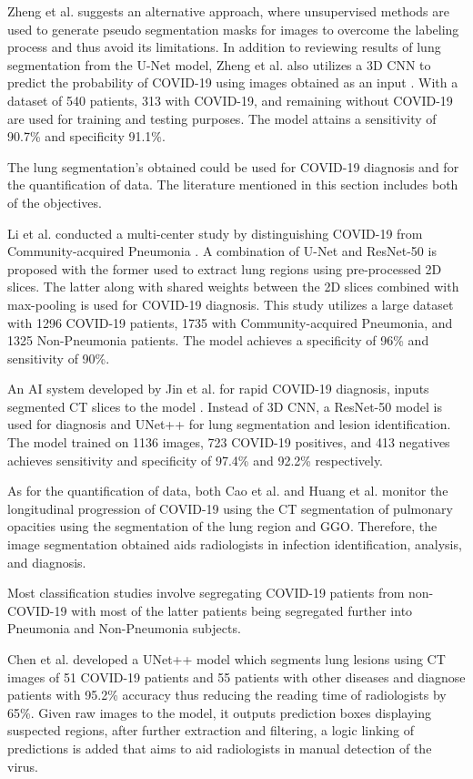 Zheng et al. suggests an alternative approach, where unsupervised methods are used to generate pseudo segmentation masks for images to overcome 
the labeling process and thus avoid its limitations. In addition to reviewing results of lung segmentation from the U-Net model, Zheng et al. also utilizes a 3D CNN to predict the probability of 
COVID-19 using images obtained as an input \cite{CXZ+2020}. With a 
dataset of 540 patients, 313 with COVID-19, and remaining without COVID-19 
are used for training and testing purposes. The model attains a sensitivity 
of 90.7\% and specificity 91.1\%.

The lung segmentation's obtained could be used for COVID-19 diagnosis and for the 
quantification of data. The literature mentioned in this section includes both of the 
objectives.

Li et al. conducted a multi-center study by distinguishing COVID-19 from Community-acquired Pneumonia \cite{LLL+2020}. A combination of U-Net and ResNet-50 is proposed with the former used to extract lung regions using pre-processed 2D slices. The latter along with shared weights between the 2D slices combined 
with max-pooling is used for COVID-19 diagnosis. This study utilizes a large dataset 
with 1296 COVID-19 patients, 1735 with Community-acquired Pneumonia, and 1325 
Non-Pneumonia patients. The model achieves a specificity of 96\% and sensitivity 
of 90\%.  

An AI system developed by Jin et al. for rapid COVID-19 diagnosis, inputs segmented CT slices to the model \cite{JSB+2020}. Instead of 3D CNN, a ResNet-50 model is used for diagnosis
and UNet++ for lung segmentation and lesion identification. The model trained on 1136 images, 723 COVID-19 positives, and 413 negatives 
achieves sensitivity and specificity of 97.4\% and 92.2\% respectively.

As for the quantification of data, both Cao et al. \cite{CYZ+2020} and Huang et al. \cite{HLR+2020} monitor the longitudinal 
progression of COVID-19 using the CT segmentation of pulmonary opacities using the segmentation of 
the lung region and GGO. Therefore, the image segmentation obtained aids radiologists 
in infection identification, analysis, and diagnosis.

Most classification studies involve segregating COVID-19 patients 
from non-COVID-19 with most of the latter patients being segregated further 
into Pneumonia and Non-Pneumonia subjects.

Chen et al. developed a UNet++ model which segments lung lesions 
\cite{CJL+2020} using CT images of 51 COVID-19 patients and 
55 patients with other diseases and diagnose patients with 95.2\% accuracy thus reducing the reading time of radiologists by 65\%. Given 
raw images to the model, it outputs prediction boxes displaying suspected regions,
after further extraction and filtering, a logic linking of predictions is added that 
aims to aid radiologists in manual detection of the virus.

